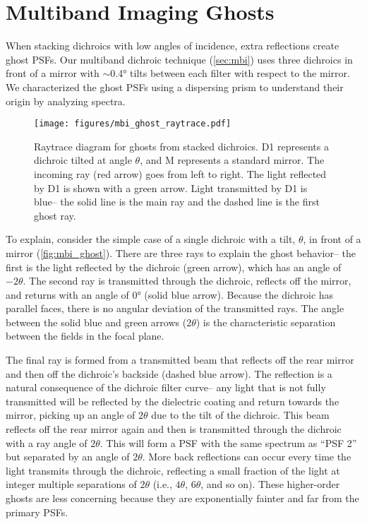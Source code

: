 \section{Multiband Imaging Ghosts}\label{sec:ghosts}

When stacking dichroics with low angles of incidence, extra reflections create ghost PSFs. Our multiband dichroic technique (\autoref{sec:mbi}) uses three dichroics in front of a mirror with $\sim$\ang{0.4} tilts between each filter with respect to the mirror. We characterized the ghost PSFs using a dispersing prism to understand their origin by analyzing spectra.
\begin{figure}
    \centering
    \texttt{[image: figures/mbi\_ghost\_raytrace.pdf]}
    \caption{Raytrace diagram for ghosts from stacked dichroics. D1 represents a dichroic tilted at angle $\theta$, and M represents a standard mirror. The incoming ray (red arrow) goes from left to right. The light reflected by D1 is shown with a green arrow. Light transmitted by D1 is blue-- the solid line is the main ray and the dashed line is the first ghost ray.\label{fig:mbi_ghost}}
\end{figure}

To explain, consider the simple case of a single dichroic with a tilt, $\theta$, in front of a mirror (\autoref{fig:mbi_ghost}). There are three rays to explain the ghost behavior-- the first is the light reflected by the dichroic (green arrow), which has an angle of $-2\theta$. The second ray is transmitted through the dichroic, reflects off the mirror, and returns with an angle of \ang{0} (solid blue arrow). Because the dichroic has parallel faces, there is no angular deviation of the transmitted rays. The angle between the solid blue and green arrows ($2\theta$) is the characteristic separation between the fields in the focal plane.

The final ray is formed from a transmitted beam that reflects off the rear mirror and then off the dichroic's backside (dashed blue arrow). The reflection is a natural consequence of the dichroic filter curve-- any light that is not fully transmitted will be reflected by the dielectric coating and return towards the mirror, picking up an angle of $2\theta$ due to the tilt of the dichroic. This beam reflects off the rear mirror again and then is transmitted through the dichroic with a ray angle of $2\theta$. This will form a PSF with the same spectrum as ``PSF 2'' but separated by an angle of $2\theta$. More back reflections can occur every time the light transmits through the dichroic, reflecting a small fraction of the light at integer multiple separations of $2\theta$ (i.e., $4\theta$, $6\theta$, and so on). These higher-order ghosts are less concerning because they are exponentially fainter and far from the primary PSFs.


